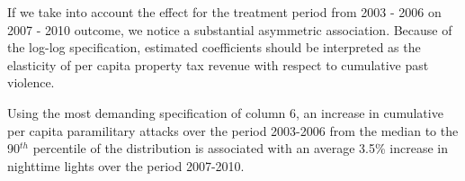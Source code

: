 If we take into account the effect for the treatment period from 2003 - 2006 on 2007 - 2010 outcome, we notice a substantial asymmetric association. Because of the log-log specification, estimated coefficients should be interpreted as the elasticity of per capita property tax revenue with respect to cumulative past violence. 

Using the most demanding specification of column 6, an increase in cumulative per capita paramilitary attacks over the period 2003-2006 from the median to the 90$^{th}$ percentile of the distribution is associated with an average 3.5\% increase in nighttime lights over the period 2007-2010. 


\bigskip


\begin{table}[htbp]
\def\sym#1{\ifmmode^{#1}\else\(^{#1}\)\fi}\caption{Consequences: Cumulative violence (1997-2002) and social outcomes (2003-2006)}
\label{appendix3:consequences_violence}
\begin{center}
\end{center}
\end{table}
\newpage


